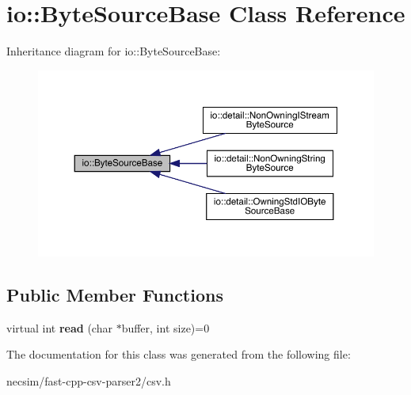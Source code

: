 \hypertarget{classio_1_1_byte_source_base}{}\section{io\+:\+:Byte\+Source\+Base Class Reference}
\label{classio_1_1_byte_source_base}


Inheritance diagram for io\+:\+:Byte\+Source\+Base\+:
\nopagebreak
\begin{figure}[H]
\begin{center}
\leavevmode
\includegraphics[width=350pt]{classio_1_1_byte_source_base__inherit__graph}
\end{center}
\end{figure}
\subsection*{Public Member Functions}
\begin{DoxyCompactItemize}
\item 
virtual int {\bfseries read} (char $\ast$buffer, int size)=0\hypertarget{classio_1_1_byte_source_base_a9598bcc869b79e44da07f0e6fa478615}{}\label{classio_1_1_byte_source_base_a9598bcc869b79e44da07f0e6fa478615}

\end{DoxyCompactItemize}


The documentation for this class was generated from the following file\+:\begin{DoxyCompactItemize}
\item 
necsim/fast-\/cpp-\/csv-\/parser2/csv.\+h\end{DoxyCompactItemize}
